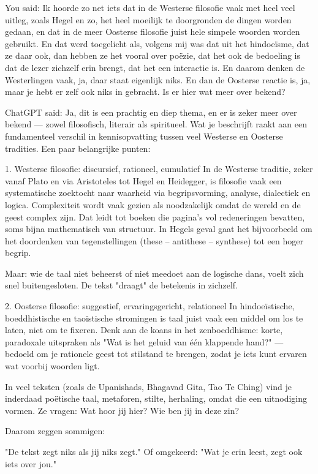 You said:
Ik hoorde zo net iets dat in de Westerse filosofie vaak met heel veel uitleg, zoals Hegel en zo, het heel moeilijk te doorgronden de dingen worden gedaan, en dat in de meer Oosterse filosofie juist hele simpele woorden worden gebruikt. En dat werd toegelicht als, volgens mij was dat uit het hindoeïsme, dat ze daar ook, dan hebben ze het vooral over poëzie, dat het ook de bedoeling is dat de lezer zichzelf erin brengt, dat het een interactie is. En daarom denken de Westerlingen vaak, ja, daar staat eigenlijk niks. En dan de Oosterse reactie is, ja, maar je hebt er zelf ook niks in gebracht. Is er hier wat meer over bekend?

ChatGPT said:
Ja, dit is een prachtig en diep thema, en er is zeker meer over bekend — zowel filosofisch, literair als spiritueel. Wat je beschrijft raakt aan een fundamenteel verschil in kennisopvatting tussen veel Westerse en Oosterse tradities. Een paar belangrijke punten:

1. Westerse filosofie: discursief, rationeel, cumulatief
In de Westerse traditie, zeker vanaf Plato en via Aristoteles tot Hegel en Heidegger, is filosofie vaak een systematische zoektocht naar waarheid via begripsvorming, analyse, dialectiek en logica. Complexiteit wordt vaak gezien als noodzakelijk omdat de wereld en de geest complex zijn. Dat leidt tot boeken die pagina's vol redeneringen bevatten, soms bijna mathematisch van structuur. In Hegels geval gaat het bijvoorbeeld om het doordenken van tegenstellingen (these – antithese – synthese) tot een hoger begrip.

Maar: wie de taal niet beheerst of niet meedoet aan de logische dans, voelt zich snel buitengesloten. De tekst "draagt" de betekenis in zichzelf.

2. Oosterse filosofie: suggestief, ervaringsgericht, relationeel
In hindoeïstische, boeddhistische en taoïstische stromingen is taal juist vaak een middel om los te laten, niet om te fixeren. Denk aan de koans in het zenboeddhisme: korte, paradoxale uitspraken als "Wat is het geluid van één klappende hand?" — bedoeld om je rationele geest tot stilstand te brengen, zodat je iets kunt ervaren wat voorbij woorden ligt.

In veel teksten (zoals de Upanishads, Bhagavad Gita, Tao Te Ching) vind je inderdaad poëtische taal, metaforen, stilte, herhaling, omdat die een uitnodiging vormen. Ze vragen: Wat hoor jij hier? Wie ben jij in deze zin?

Daarom zeggen sommigen:

"De tekst zegt niks als jij niks zegt."
Of omgekeerd:
"Wat je erin leest, zegt ook iets over jou."

